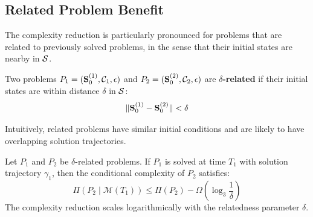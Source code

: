 \subsection{Related Problem Benefit}

The complexity reduction is particularly pronounced for problems that are related to previously solved problems, in the sense that their initial states are nearby in $\mathcal{S}$.

\begin{definition}
\label{def:problem_relatedness}
Two problems $P_1 = (\mathbf{S}_0^{(1)}, \mathcal{C}_1, \epsilon)$ and $P_2 = (\mathbf{S}_0^{(2)}, \mathcal{C}_2, \epsilon)$ are \textbf{$\delta$-related} if their initial states are within distance $\delta$ in $\mathcal{S}$:
\begin{equation}
\|\mathbf{S}_0^{(1)} - \mathbf{S}_0^{(2)}\| < \delta
\label{eq:problem_relatedness}
\end{equation}

Intuitively, related problems have similar initial conditions and are likely to have overlapping solution trajectories.
\end{definition}

\begin{theorem}
\label{thm:related_acceleration}
Let $P_1$ and $P_2$ be $\delta$-related problems. If $P_1$ is solved at time $T_1$ with solution trajectory $\gamma_1$, then the conditional complexity of $P_2$ satisfies:
\begin{equation}
\Pi(P_2 \mid \mathcal{M}(T_1)) \leq \Pi(P_2) - \Omega\left(\log_3\frac{1}{\delta}\right)
\label{eq:related_acceleration}
\end{equation}
The complexity reduction scales logarithmically with the relatedness parameter $\delta$.
\end{theorem}

